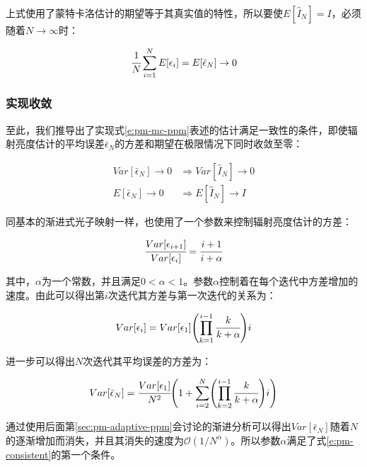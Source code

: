 上式使用了蒙特卡洛估计的期望等于其真实值的特性，所以要使$E[\hat{I}_N]=I$，必须随着$N\to\infty$时：

\begin{equation}
	 \cfrac{1}{N}\sum^{N}_{i=1}E[\epsilon_i]=E[\bar{\epsilon}_N]\to 0
\end{equation}





\subsubsection{实现收敛}
至此，我们推导出了实现式\ref{e:pm-mc-ppm}表述的估计满足一致性的条件，即使辐射亮度估计的平均误差$\bar{\epsilon}_N$的方差和期望在极限情况下同时收敛至零：

\begin{equation}\label{e:pm-consistent}
	\begin{aligned}
		Var[\bar{\epsilon}_N]\to 0 &\Rightarrow Var[\hat{I}_N]\to 0\\
		E[\bar{\epsilon}_N]\to 0 &\Rightarrow E[\hat{I}_N]\to I
	\end{aligned}
\end{equation}

同基本的渐进式光子映射一样，\cite{a:ProgressivePhotonMappingAProbabilisticApproach}也使用了一个参数来控制辐射亮度估计的方差：

\begin{equation}
	 \cfrac{Var[\epsilon_{i+1}]}{Var[\epsilon_i]}= \cfrac{i+1}{i+\alpha}
\end{equation}

\noindent 其中，$\alpha$为一个常数，并且满足$0<\alpha<1$。参数$\alpha$控制着在每个迭代中方差增加的速度。由此可以得出第$i$次迭代其方差与第一次迭代的关系为：

\begin{equation}
	Var[\epsilon_i]=Var[\epsilon_1]\Biggl(\prod^{i-1}_{k=1} \cfrac{k}{k+\alpha}\Biggl) i
\end{equation}

\noindent 进一步可以得出$N$次迭代其平均误差的方差为：

\begin{equation}
	Var[\bar{\epsilon}_N]= \cfrac{Var[\epsilon_1]}{N^{2}}\Biggl( 1+\sum^{N}_{i=2}\Biggl(\prod^{i-1}_{k=2} \cfrac{k}{k+\alpha}\Biggl) i\Biggl)
\end{equation}

通过使用后面第\ref{sec:pm-adaptive-ppm}会讨论的渐进分析可以得出$Var[\bar{\epsilon}_N]$随着$N$的逐渐增加而消失，并且其消失的速度为$\mathcal{O}(1/N^{\alpha})$。所以参数$\alpha$满足了式\ref{e:pm-consistent}的第一个条件。

